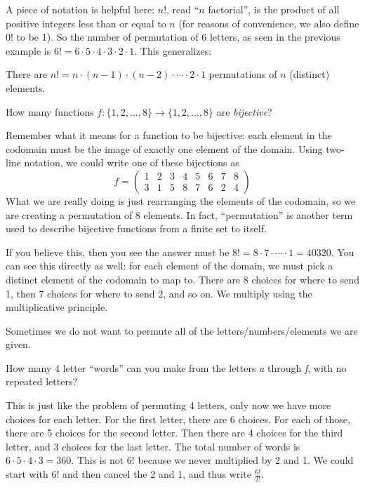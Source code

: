 \documentclass[11pt,]{book}
\theoremstyle{ptxplainnotitle}
\theoremstyle{ptxplaintitle}
\theoremstyle{ptxdefinitionnotitle}
\theoremstyle{ptxdefinitiontitle}
\theoremstyle{ptxdefinitionnotitle}
\theoremstyle{ptxdefinitiontitle}
\theoremstyle{ptxdefinitionnotitle}
\theoremstyle{ptxdefinitiontitle}
\theoremstyle{ptxdefinitiontitlenonumber}
\theoremstyle{ptxdefinitiontitlenonumber}
\numberwithin{equation}{chapter}
\newcommand{\twoline}[2]{\begin{pmatrix}#1 \\ #2 \end{pmatrix}}
\newcommand{\amp}{&}
\begin{document}
\hypertarget{p-1459}{}%
A piece of notation is helpful here: \(n!\), read ``\(n\) factorial'', is the product of all positive integers less than or equal to \(n\) (for reasons of convenience, we also define 0! to be 1). So the number of permutation of 6 letters, as seen in the previous example is \(6! = 6\cdot 5 \cdot 4 \cdot 3 \cdot 2 \cdot 1\). This generalizes:%
\begin{assemblage}\label{assemblage-21}
\hypertarget{p-1460}{}%
There are \(n! = n\cdot (n-1)\cdot (n-2)\cdot \cdots \cdot 2\cdot 1\) permutations of \(n\) (distinct) elements.%
\end{assemblage}
\begin{example}\label{example-counting-functions-bijective}
\hypertarget{p-1461}{}%
How many functions \(f:\{1,2,\ldots,8\} \to \{1,2,\ldots, 8\}\) are \emph{bijective}?%
\par\smallskip%
\noindent\textbf{}\hypertarget{solution-187}{}\hypertarget{p-1462}{}%
Remember what it means for a function to be bijective: each element in the codomain must be the image of exactly one element of the domain. Using two-line notation, we could write one of these bijections as%
\begin{equation*}
f = \twoline{1 \amp 2 \amp 3 \amp 4 \amp 5 \amp 6 \amp 7 \amp 8} {3 \amp 1 \amp 5 \amp 8 \amp 7 \amp 6 \amp 2 \amp 4}
\end{equation*}
What we are really doing is just rearranging the elements of the codomain, so we are creating a permutation of 8 elements. In fact, ``permutation'' is another term used to describe bijective functions from a finite set to itself.%
\par
\hypertarget{p-1463}{}%
If you believe this, then you see the answer must be \(8! = 8 \cdot 7 \cdot\cdots\cdot 1 = 40320\). You can see this directly as well: for each element of the domain, we must pick a distinct element of the codomain to map to. There are 8 choices for where to send 1, then 7 choices for where to send 2, and so on. We multiply using the multiplicative principle.%
\end{example}
\hypertarget{p-1464}{}%
Sometimes we do not want to permute all of the letters/numbers/elements we are given.%
\begin{example}\label{example-44}
\hypertarget{p-1465}{}%
How many 4 letter ``words'' can you make from the letters \emph{a} through \emph{f}, with no repeated letters?%
\par\smallskip%
\noindent\textbf{}\hypertarget{solution-188}{}\hypertarget{p-1466}{}%
This is just like the problem of permuting 4 letters, only now we have more choices for each letter. For the first letter, there are 6 choices. For each of those, there are 5 choices for the second letter. Then there are 4 choices for the third letter, and 3 choices for the last letter. The total number of words is \(6\cdot 5\cdot 4 \cdot 3 = 360\). This is not \(6!\) because we never multiplied by 2 and 1. We could start with \(6!\) and then cancel the 2 and 1, and thus write \(\frac{6!}{2!}\).%
\end{example}
\end{document}

